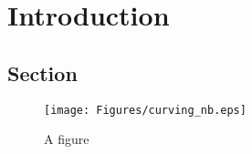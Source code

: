 
\chapter{Introduction}
\lhead[\fancyplain{}{\thepage}]{\fancyplain{}{\rightmark}}
 \thispagestyle{plain}
\setlength{\parindent}{10mm}


\section{Section}

\citep{NbodySample}
\begin{figure}
\texttt{[image: Figures/curving\_nb.eps]}
\caption{A figure}
\label{1:fig1}
\end{figure}

%